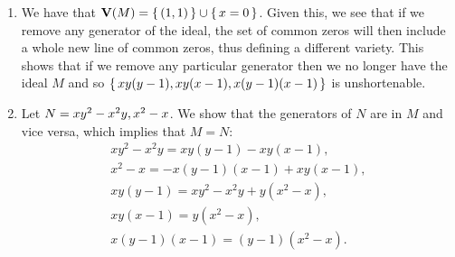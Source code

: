 \documentclass[letterpaper, 11pt, oneside]{book}
\begin{document}
\begin{sol}\label{ex:UAG_5.4.4}
  \begin{enumerate}
    \item We have that $\operatorname{\mathbf{V}}(M) = \set{(1, 1)} \cup \set{x = 0}$.
          Given this, we see that if we remove any generator of the ideal, the set of common zeros will then include a whole new line of common zeros, thus defining a different variety.
          This shows that if we remove any particular generator then we no longer have the ideal $M$ and so $\set{xy(y - 1), xy(x - 1), x(y - 1)(x - 1)}$ is unshortenable.
    \item Let $N = \ideal{xy^{2} - x^{2}y, x^{2} - x}$.
          We show that the generators of $N$ are in $M$ and vice versa, which implies that $M = N$:
          \begin{gather*}
            xy^{2} - x^{2}y = xy(y - 1) - xy(x - 1), \\
            x^{2} - x = -x(y - 1)(x -1) + xy(x - 1), \\
            xy(y - 1) = xy^{2} - x^{2}y + y(x^{2} - x), \\
            xy(x - 1) = y(x^{2} - x), \\
            x(y - 1)(x - 1) = (y - 1)(x^{2} -x).
          \end{gather*}
  \end{enumerate}
\end{sol}

\printbibliography
\end{document}
